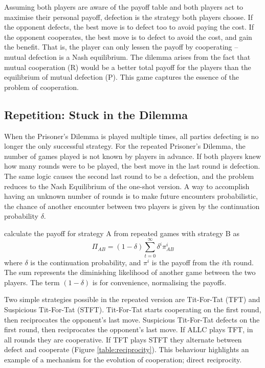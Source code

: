 \documentclass[a4paper,11pt,bcshonoursthesis,singlespace,oneside,thesisdraft,pdflatex]{cssethesis}
\begin{document}
Assuming both players are aware of the payoff table and both players act to maximise their personal payoff, defection is the strategy both players choose. 
If the opponent defects, the best move is to defect too to avoid paying the cost. 
If the opponent cooperates, the best move is to defect to avoid the cost, and gain the benefit. 
That is, the player can only lessen the payoff by cooperating -- mutual defection is a Nash equilibrium. 
The dilemma arises from the fact that mutual cooperation (R) would be a better total payoff for the players than the equilibrium of mutual defection (P). 
This game captures the essence of the problem of cooperation.
\subsection{Repetition: Stuck in the Dilemma}
When the Prisoner's Dilemma is played multiple times, all parties defecting is no longer the only successful strategy. 
For the repeated Prisoner's Dilemma, the number of games played is not known by players in advance. 
If both players knew how many rounds were to be played, the best move in the last round is defection. 
The same logic causes the second last round to be a defection, and the problem reduces to the Nash Equilibrium of the one-shot version. 
A way to accomplish having an unknown number of rounds is to make future encounters probabilistic, the chance of another encounter between two players is given by the continuation probability $\delta$.

\citet{garcia:PLoSOne:2012} calculate the payoff for strategy A from repeated games with strategy B as
\begin{equation}
\label{eqn:repeatedPayoff}
\Pi_{AB}=(1-\delta)\sum^{\infty}_{t=0} \delta^i\pi^i_{AB}
\end{equation}
where $\delta$ is the continuation probability, and $\pi^i$ is the payoff from the $i$th round. 
The sum represents the diminishing likelihood of another game between the two players. 
The term $(1-\delta)$ is for convenience, normalising the payoffs.
 
Two simple strategies possible in the repeated version are Tit-For-Tat (TFT) and Suspicious Tit-For-Tat (STFT). 
Tit-For-Tat starts cooperating on the first round, then reciprocates the opponent's last move. 
Suspicious Tit-For-Tat defects on the first round, then reciprocates the opponent's last move. 
If ALLC plays TFT, in all rounds they are cooperative.  
If TFT plays STFT they alternate between defect and cooperate (Figure \ref{table:reciprocity}). 
This behaviour highlights an example of a mechanism for the evolution of cooperation; direct reciprocity. 
\end{document}
